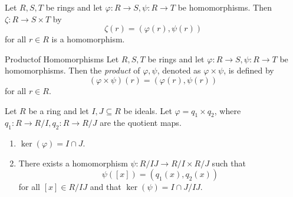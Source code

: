 \documentclass[pmath347]{subfiles}
\begin{document}
    \begin{prop}{}
        Let $R,S,T$ be rings and let $\varphi:R\to S, \psi:R\to T$ be homomorphisms. Then $\zeta:R\to S\times T$ by
        \begin{equation*}
            \zeta\left( r \right) = \left( \varphi\left( r \right) ,\psi\left( r \right)  \right) 
        \end{equation*}
        for all $r \in R$ is a homomorphism.
    \end{prop}

    \begin{definition}{Product}{of Homomorphisms}
        Let $R,S,T$ be rings and let $\varphi:R\to S, \psi:R\to T$ be homomorphisms. Then the \emph{product} of $\varphi,\psi$, denoted as $\varphi\times\psi$, is defined by
        \begin{equation*}
            \left(\varphi\times\psi\right) \left( r \right) = \left( \varphi\left( r \right) , \psi\left( r \right)  \right) 
        \end{equation*}
        for all $r\in R$.
    \end{definition}

    \begin{prop}{}
        Let $R$ be a ring and let $I,J\subseteq R$ be ideals. Let $\varphi=q_1\times q_2$, where $q_1:R\to R /I, q_2:R\to R /J$ are the quotient maps.
        \begin{enumerate}
            \item $\ker\left( \varphi \right) = I\cap J$.
            \item There exists a homomorphism $\psi:R /IJ\to R /I\times R /J$ such that
                \begin{equation*}
                    \psi\left( \left[ x \right]  \right) = \left( q_1\left( x \right) ,q_2\left( x \right)  \right) 
                \end{equation*}
                for all $\left[ x \right] \in R /IJ$ and that $\ker\left( \psi \right) = I\cap J /IJ$.
        \end{enumerate}
    \end{prop}
\end{document}

